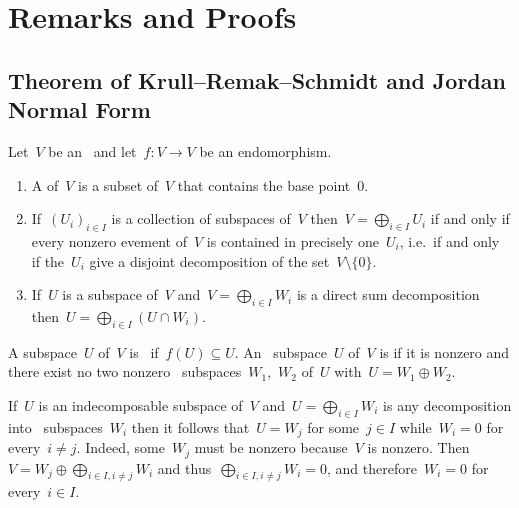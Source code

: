 \documentclass[a4paper,11pt]{scrartcl}
\begin{document}
\newpage
\appendix
\section{Remarks and Proofs}



\subsection{Theorem of Krull--Remak--Schmidt and Jordan Normal Form}
\label{jordan normal form}

Let~$V$ be an~ and let~$f \colon V \to V$ be an endomorphism.

\begin{recall}
  \begin{enumerate}
    \item
      A  of~$V$ is a subset of~$V$ that contains the base point~$0$.
    \item
      If~$(U_i)_{i \in I}$ is a collection of subspaces of~$V$ then~$V = \bigoplus_{i \in I} U_i$ if and only if every nonzero evement of~$V$ is contained in precisely one~$U_i$, i.e.\ if and only if the~$U_i$ give a disjoint decomposition of the set~$V \setminus \{ 0 \}$.
    \item
      If~$U$ is a subspace of~$V$ and~$V = \bigoplus_{i \in I} W_i$ is a direct sum decomposition then~$U = \bigoplus_{i \in I} (U \cap W_i)$.
  \end{enumerate}
\end{recall}

\begin{definition}
  A subspace~$U$ of~$V$ is~ if~$f(U) \subseteq U$.
  An~ subspace~$U$ of~$V$ is  if it is nonzero and there exist no two nonzero~ subspaces~$W_1$,~$W_2$ of~$U$ with~$U = W_1 \oplus W_2$.
\end{definition}

\begin{remark}
  If~$U$ is an indecomposable subspace of~$V$ and~$U = \bigoplus_{i \in I} W_i$ is any decomposition into~ subspaces~$W_i$ then it follows that~$U = W_j$ for some~$j \in I$ while~$W_i = 0$ for every~$i \neq j$.
  Indeed, some~$W_j$ must be nonzero because~$V$ is nonzero.
  Then~$V = W_j \oplus \bigoplus_{i \in I, i \neq j} W_i$ and thus~$\bigoplus_{i \in I, i \neq j} W_i = 0$, and therefore~$W_i = 0$ for every~$i \in I$.
\end{remark}
\end{document}
